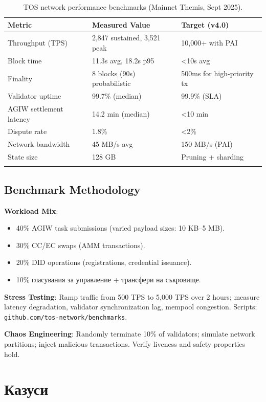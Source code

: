 \documentclass[11pt]{article}
\begin{document}
\begin{longtable}{@{}p{}p{}p{}@{}}
\toprule
\textbf{Metric} & \textbf{Measured Value} & \textbf{Target (v4.0)} \\\midrule
Throughput (TPS) & 2,847 sustained, 3,521 peak & 10,000+ with PAI \\
Block time & 11.3s avg, 18.2s p95 & <10s avg \\
Finality & 8 blocks (90s) probabilistic & 500ms for high-priority tx \\
Validator uptime & 99.7\% (median) & 99.9\% (SLA) \\
AGIW settlement latency & 14.2 min (median) & <10 min \\
Dispute rate & 1.8\% & <2\% \\
Network bandwidth & 45 MB/s avg & 150 MB/s (PAI) \\
State size & 128 GB & Pruning + sharding \\
\bottomrule
\caption{TOS network performance benchmarks (Mainnet Themis, Sept 2025).}
\end{longtable}

\subsection{Benchmark Methodology}

\textbf{Workload Mix}:
\begin{itemize}[noitemsep]
  \item 40\% AGIW task submissions (varied payload sizes: 10 KB--5 MB).
  \item 30\% CC/EC swaps (AMM transactions).
  \item 20\% DID operations (registrations, credential issuance).
  \item 10\% гласувания за управление + трансфери на съкровище.
\end{itemize}

\textbf{Stress Testing}: Ramp traffic from 500 TPS to 5,000 TPS over 2 hours; measure latency degradation, validator synchronization lag, mempool congestion. Scripts: \texttt{github.com/tos-network/benchmarks}.

\textbf{Chaos Engineering}: Randomly terminate 10\% of validators; simulate network partitions; inject malicious transactions. Verify liveness and safety properties hold.

\section{Казуси}
\label{sec:case-studies}
\end{document}

